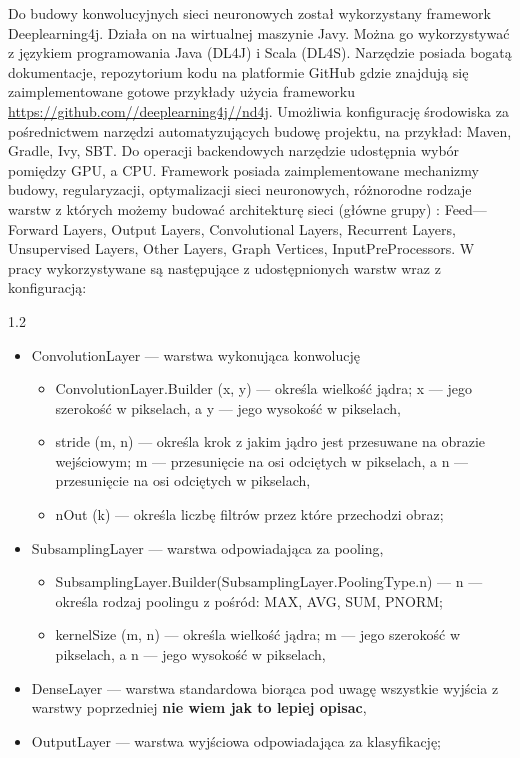 \documentclass[a4paper,12pt]{article}
\newcommand\spacingInSolemnItemize{1.2}
\begin{document}
        \par Do budowy konwolucyjnych sieci neuronowych został wykorzystany framework Deeplearning4j. Działa on na wirtualnej maszynie Javy. 
			Można go wykorzystywać z językiem programowania Java (DL4J) i Scala (DL4S). Narzędzie posiada bogatą dokumentacje, repozytorium kodu na 
			platformie GitHub gdzie znajdują się zaimplementowane gotowe przykłady użycia frameworku 
			\href{https://github.com//deeplearning4j//nd4j}{\url{https://github.com//deeplearning4j//nd4j}}. Umożliwia konfigurację środowiska 
			za pośrednictwem narzędzi automatyzujących budowę projektu, na przykład: Maven, Gradle, Ivy, SBT. Do operacji backendowych narzędzie 
			udostępnia wybór pomiędzy GPU, a CPU. Framework posiada zaimplementowane mechanizmy budowy, regularyzacji, optymalizacji sieci neuronowych, 
			różnorodne rodzaje warstw z których możemy budować architekturę sieci (główne grupy) : Feed---Forward Layers, Output Layers, Convolutional Layers, 
			Recurrent Layers,  Unsupervised Layers, Other Layers, Graph Vertices, InputPreProcessors. 
			W pracy wykorzystywane są następujące z udostępnionych warstw wraz z konfiguracją: 

			\begin{spacing}{\spacingInSolemnItemize}
				\begin{itemize}
					\item ConvolutionLayer --- warstwa wykonująca konwolucję
						\begin{itemize}
							\item ConvolutionLayer.Builder (x, y) --- określa wielkość jądra; x --- jego szerokość w pikselach, a y --- jego wysokość w pikselach,
							\item stride (m, n) --- określa krok z jakim jądro jest przesuwane na obrazie wejściowym; m --- przesunięcie na osi odciętych w pikselach, 
								a n --- przesunięcie na osi odciętych w pikselach,
							\item nOut (k) --- określa liczbę filtrów przez które przechodzi obraz;
						\end{itemize}
					\item SubsamplingLayer --- warstwa odpowiadająca za pooling,
						\begin{itemize}
							\item SubsamplingLayer.Builder(SubsamplingLayer.PoolingType.n) --- n --- określa rodzaj poolingu z pośród: MAX, AVG, SUM, PNORM; 
							\item kernelSize (m, n) --- określa wielkość jądra; m --- jego szerokość w pikselach, a n --- jego wysokość w pikselach,
						\end{itemize}
					\item DenseLayer --- warstwa standardowa biorąca pod uwagę wszystkie wyjścia z warstwy poprzedniej \textbf{nie wiem jak to lepiej opisac},
					\item OutputLayer --- warstwa wyjściowa odpowiadająca za klasyfikację;
				\end{itemize}
			\end{spacing}
			
\end{document}
